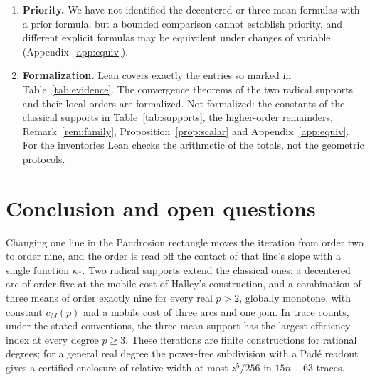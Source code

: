 \begin{enumerate}[label=\arabic*.]
  analysed.
\item \textbf{Priority.} We have not identified the decentered or three-mean formulas with a prior formula,
  but a bounded comparison cannot establish priority, and different explicit formulas may be equivalent under changes of variable
  (Appendix~\ref{app:equiv}).
\item \textbf{Formalization.} Lean covers exactly the entries so marked in Table~\ref{tab:evidence}.
  The convergence theorems of the two radical supports and their local orders are formalized. Not
  formalized: the constants of the classical supports in Table~\ref{tab:supports}, the higher-order
  remainders, Remark~\ref{rem:family}, Proposition~\ref{prop:scalar} and Appendix~\ref{app:equiv}. For the inventories Lean checks
  the arithmetic of the totals, not the geometric protocols.
\end{enumerate}

\section{Conclusion and open questions}\label{sec:conclusion}

Changing one line in the Pandrosion rectangle moves the iteration from order two to order nine, and the
order is read off the contact of that line's slope with a single function $\kappa_*$. Two radical
supports extend the classical ones: a decentered arc of order five at the mobile cost of Halley's
construction, and a combination of three means of order exactly nine for every real $p>2$, globally
monotone, with constant $c_M(p)$ and a mobile cost of three arcs and one join. In trace counts, under
the stated conventions, the three-mean support has the largest efficiency index at every degree
$p\ge3$. These iterations are finite constructions
for rational degrees; for a general real degree the power-free subdivision with a Pad\'e readout gives a
certified enclosure of relative width at most $z^{5}/256$ in $15n+63$ traces.

